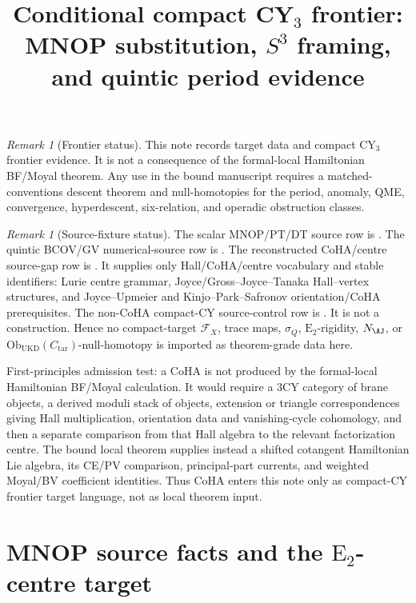 \documentclass[12pt]{amsart}
\title[Compact CY$_3$ frontier]{Conditional compact CY$_3$ frontier:
  MNOP substitution, $S^3$ framing, and quintic period evidence}
\theoremstyle{remark}
\newtheorem{rmk}[thm]{Remark}
\providecommand{\E}{\mathrm{E}}
\providecommand{\cF}{\mathcal{F}}
\begin{document}
\maketitle

\begin{rmk}[Frontier status]
This note records target data and compact CY\(_3\) frontier evidence.
It is not a consequence of the formal-local Hamiltonian BF/Moyal theorem.
Any use in the bound manuscript requires a matched-conventions descent
theorem and null-homotopies for the period, anomaly, QME, convergence,
hyperdescent, six-relation, and operadic obstruction classes.
\end{rmk}

\begin{rmk}[Source-fixture status]
The scalar MNOP/PT/DT source row is
.
The quintic BCOV/GV numerical-source row is
.
The reconstructed CoHA/centre source-gap row is
.
It supplies only Hall/CoHA/centre vocabulary and stable identifiers:
Lurie centre grammar, Joyce/Gross--Joyce--Tanaka Hall--vertex
structures, and Joyce--Upmeier and Kinjo--Park--Safronov
orientation/CoHA prerequisites. The non-CoHA compact-CY source-control
row is
.
It is not a construction. Hence no compact-target \(\cF_X\), trace maps,
\(\sigma_Q\), \(\E_2\)-rigidity, \(N_{\AJ}\), or
\(\mathrm{Ob}_{\mathrm{UKD}}(C_{\mathrm{tar}})\)-null-homotopy is
imported as theorem-grade data here.

First-principles admission test: a CoHA is not produced by the
formal-local Hamiltonian BF/Moyal calculation.  It would require a
3CY category of brane objects, a derived moduli stack of objects,
extension or triangle correspondences giving Hall multiplication,
orientation data and vanishing-cycle cohomology, and then a separate
comparison from that Hall algebra to the relevant factorization centre.
The bound local theorem supplies instead a shifted cotangent Hamiltonian
Lie algebra, its CE/PV comparison, principal-part currents, and weighted
Moyal/BV coefficient identities.  Thus CoHA enters this note only as
compact-CY frontier target language, not as local theorem input.
\end{rmk}

\section{MNOP source facts and the $\E_2$-centre target}\label{sec:mnop}
\end{document}

